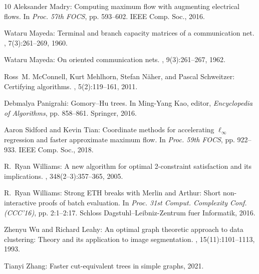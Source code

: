 \begin{thebibliography}{10}
{\sc Aleksander Madry}: Computing maximum flow with augmenting electrical
  flows.
\newblock In {\em Proc. 57th FOCS}, pp. 593--602. IEEE Comp. Soc., 2016.

{\sc Wataru Mayeda}: Terminal and branch capacity matrices of a communication
  net.
, 7(3):261--269, 1960.

{\sc Wataru Mayeda}: On oriented communication nets.
, 9(3):261--267, 1962.

{\sc Ross~M. McConnell, Kurt Mehlhorn, Stefan N{\"a}her, and Pascal
  Schweitzer}: Certifying algorithms.
, 5(2):119--161, 2011.

{\sc Debmalya Panigrahi}: {G}omory--{H}u trees.
\newblock In {\sc Ming-Yang Kao}, editor, {\em Encyclopedia of Algorithms}, pp.
  858--861. Springer, 2016.
\newblock [\epfmtdoi{10.1007/978-1-4939-2864-4\_168}]

{\sc Aaron Sidford and Kevin Tian}: Coordinate methods for accelerating
  $\ell_{\infty}$ regression and faster approximate maximum flow.
\newblock In {\em Proc. 59th FOCS}, pp. 922--933. IEEE Comp. Soc., 2018.

{\sc R.~Ryan Williams}: A new algorithm for optimal 2-constraint satisfaction
  and its implications.
, 348(2--3):357--365, 2005.

{\sc R.~Ryan Williams}: Strong {ETH} breaks with {M}erlin and {A}rthur: Short
  non-interactive proofs of batch evaluation.
\newblock In {\em Proc. 31st Comput. Complexity Conf. (CCC'16)}, pp. 2:1--2:17.
  Schloss Dagstuhl--Leibniz-Zentrum fuer Informatik, 2016.

{\sc Zhenyu Wu and Richard Leahy}: An optimal graph theoretic approach to data
  clustering: Theory and its application to image segmentation.
, 15(11):1101--1113,
  1993.
\newblock [\epfmtdoi{10.1109/34.244673}]

{\sc Tianyi Zhang}: Faster cut-equivalent trees in simple graphs, 2021.

\end{thebibliography}